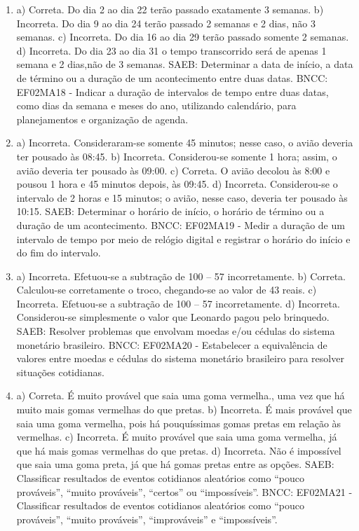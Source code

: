 \begin{enumerate}
\item
a) Correta. Do dia 2 ao dia 22 terão passado exatamente 3 semanas.
b) Incorreta. Do dia 9 ao dia 24 terão passado 2 semanas e 2 dias, não 3 semanas.
c) Incorreta. Do dia 16 ao dia 29 terão passado somente 2 semanas.
d) Incorreta. Do dia 23 ao dia 31 o tempo transcorrido será de apenas 1 semana e 2 dias,não de 3 semanas.
SAEB: Determinar a data de início, a data de término ou a
duração de um acontecimento entre duas datas.
BNCC: EF02MA18 - Indicar a duração de intervalos de tempo entre
duas datas, como dias da semana e meses do ano, utilizando calendário,
para planejamentos e organização de agenda.

\item
a) Incorreta. Consideraram-se somente 45 minutos; nesse caso, o avião deveria ter pousado às 08:45.
b) Incorreta. Considerou-se somente 1 hora; assim, o avião deveria ter pousado às 09:00.
c) Correta. O avião decolou às 8:00 e pousou 1 hora e 45 minutos depois, às 09:45.
d) Incorreta. Considerou-se o intervalo de 2 horas e 15 minutos; o avião, nesse caso, deveria ter
pousado às 10:15.
SAEB: Determinar o horário de início, o horário de término ou a
duração de um acontecimento.
BNCC: EF02MA19 - Medir a duração de um intervalo de tempo por meio de
relógio digital e registrar o horário do início e do fim do intervalo.

\item
a) Incorreta. Efetuou-se a subtração de 100 -- 57 incorretamente.
b) Correta. Calculou-se corretamente o troco, chegando-se ao valor de 43 reais.
c) Incorreta. Efetuou-se a subtração de 100 -- 57 incorretamente.
d) Incorreta. Considerou-se simplesmente o valor que Leonardo pagou pelo brinquedo.
SAEB: Resolver problemas que envolvam moedas e/ou cédulas do
sistema monetário brasileiro. 
BNCC: EF02MA20 - Estabelecer a
equivalência de valores entre moedas e cédulas do sistema monetário
brasileiro para resolver situações cotidianas.

\item
a) Correta. É muito provável que saia uma goma vermelha., uma vez que há
muito mais gomas vermelhas do que pretas.
b) Incorreta. É mais provável que saia uma goma vermelha, pois há
pouquíssimas gomas pretas em relação às vermelhas.
c) Incorreta. É muito provável que saia uma goma vermelha, já que há
mais gomas vermelhas do que pretas.
d) Incorreta. Não é impossível que saia uma goma preta, já que há gomas
pretas entre as opções.
SAEB: Classificar resultados de eventos cotidianos aleatórios
como ``pouco prováveis'', ``muito prováveis'', ``certos'' ou
``impossíveis''.
BNCC: EF02MA21 - Classificar resultados de eventos cotidianos aleatórios
como ``pouco prováveis'', ``muito prováveis'', ``improváveis'' e
``impossíveis''.


\end{enumerate}
